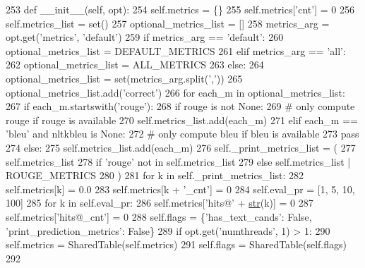 \begin{DoxyCode}
253     \textcolor{keyword}{def }\_\_init\_\_(self, opt):
254         self.metrics = \{\}
255         self.metrics[\textcolor{stringliteral}{'cnt'}] = 0
256         self.metrics\_list = set()
257         optional\_metrics\_list = []
258         metrics\_arg = opt.get(\textcolor{stringliteral}{'metrics'}, \textcolor{stringliteral}{'default'})
259         \textcolor{keywordflow}{if} metrics\_arg == \textcolor{stringliteral}{'default'}:
260             optional\_metrics\_list = DEFAULT\_METRICS
261         \textcolor{keywordflow}{elif} metrics\_arg == \textcolor{stringliteral}{'all'}:
262             optional\_metrics\_list = ALL\_METRICS
263         \textcolor{keywordflow}{else}:
264             optional\_metrics\_list = set(metrics\_arg.split(\textcolor{stringliteral}{','}))
265             optional\_metrics\_list.add(\textcolor{stringliteral}{'correct'})
266         \textcolor{keywordflow}{for} each\_m \textcolor{keywordflow}{in} optional\_metrics\_list:
267             \textcolor{keywordflow}{if} each\_m.startswith(\textcolor{stringliteral}{'rouge'}):
268                 \textcolor{keywordflow}{if} rouge \textcolor{keywordflow}{is} \textcolor{keywordflow}{not} \textcolor{keywordtype}{None}:
269                     \textcolor{comment}{# only compute rouge if rouge is available}
270                     self.metrics\_list.add(each\_m)
271             \textcolor{keywordflow}{elif} each\_m == \textcolor{stringliteral}{'bleu'} \textcolor{keywordflow}{and} nltkbleu \textcolor{keywordflow}{is} \textcolor{keywordtype}{None}:
272                 \textcolor{comment}{# only compute bleu if bleu is available}
273                 \textcolor{keywordflow}{pass}
274             \textcolor{keywordflow}{else}:
275                 self.metrics\_list.add(each\_m)
276         self.\_print\_metrics\_list = (
277             self.metrics\_list
278             \textcolor{keywordflow}{if} \textcolor{stringliteral}{'rouge'} \textcolor{keywordflow}{not} \textcolor{keywordflow}{in} self.metrics\_list
279             \textcolor{keywordflow}{else} self.metrics\_list | ROUGE\_METRICS
280         )
281         \textcolor{keywordflow}{for} k \textcolor{keywordflow}{in} self.\_print\_metrics\_list:
282             self.metrics[k] = 0.0
283             self.metrics[k + \textcolor{stringliteral}{'\_cnt'}] = 0
284         self.eval\_pr = [1, 5, 10, 100]
285         \textcolor{keywordflow}{for} k \textcolor{keywordflow}{in} self.eval\_pr:
286             self.metrics[\textcolor{stringliteral}{'hits@'} + \hyperlink{namespacegenerate__task__READMEs_a5b88452ffb87b78c8c85ececebafc09f}{str}(k)] = 0
287         self.metrics[\textcolor{stringliteral}{'hits@\_cnt'}] = 0
288         self.flags = \{\textcolor{stringliteral}{'has\_text\_cands'}: \textcolor{keyword}{False}, \textcolor{stringliteral}{'print\_prediction\_metrics'}: \textcolor{keyword}{False}\}
289         \textcolor{keywordflow}{if} opt.get(\textcolor{stringliteral}{'numthreads'}, 1) > 1:
290             self.metrics = SharedTable(self.metrics)
291             self.flags = SharedTable(self.flags)
292 
\end{DoxyCode}


